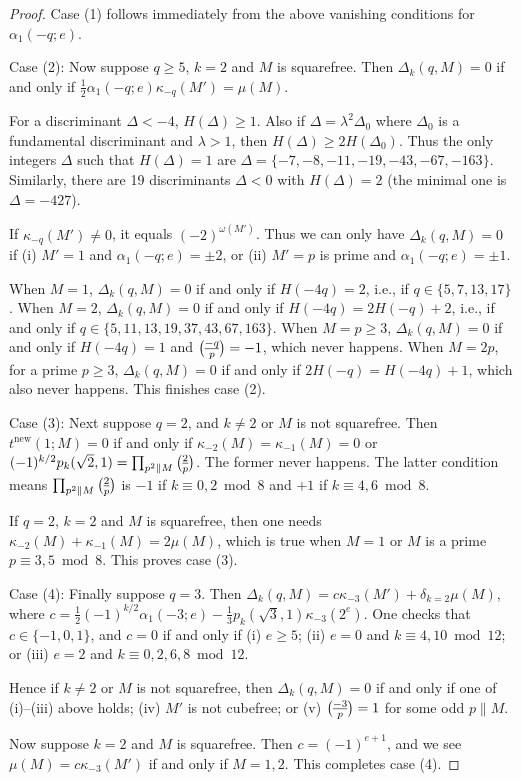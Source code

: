 \documentclass[10pt,a4paper]{amsart}
\newcommand{\leg}{\overwithdelims ()}
\newcommand{\new}{\mathrm{new}}
\renewcommand{\mod}{\bmod}
\begin{document}
\begin{proof} 

Case (1) follows immediately from the above vanishing conditions for $\alpha_1(-q;e)$.

Case (2): Now suppose $q \ge 5$, $k=2$ and $M$ is squarefree.  Then $\Delta_k(q,M) = 0$ if and only if $\frac 12 \alpha_1(-q;e) \kappa_{-q}(M') = \mu(M)$.  

For a discriminant $\Delta < -4$, $H(\Delta) \ge 1$.
Also if $\Delta = \lambda^2 \Delta_0$ where $\Delta_0$ is a fundamental discriminant and $\lambda > 1$, then $H(\Delta) \ge 2 H(\Delta_0)$.  Thus the only integers $\Delta$ such that $H(\Delta) = 1$ are $\Delta = \{ -7, -8, -11, -19, -43, -67, -163 \}$.  Similarly, there are 19 discriminants $\Delta < 0$ with $H(\Delta) = 2$ (the minimal one is $\Delta = -427$).

If $\kappa_{-q}(M') \ne 0$, it equals $(-2)^{\omega(M')}$.  Thus we can only have
$\Delta_k(q,M) = 0$ if (i) $M' = 1$ and $\alpha_1(-q; e) = \pm 2$, or (ii)  $M' = p$ is prime and $\alpha_1(-q; e) = \pm 1$.  

When $M=1$, $\Delta_k(q,M) = 0$ if and only if $H(-4q) = 2$, i.e., if $q \in \{ 5, 7, 13, 17 \}$.  When $M = 2$, $\Delta_k(q,M) = 0$ if and only if $H(-4q) = 2 H(-q) + 2$, i.e., if and only if $q \in \{ 5, 11, 13, 19, 37, 43, 67, 163 \}$.
When $M = p \ge 3$, $\Delta_k(q,M) = 0$ if and only if $H(-4q) = 1$ and ${-q \leg p} = -1$, which never happens.
When $M = 2p$, for a prime $p \ge 3$, $\Delta_k(q,M) = 0$ if and only if $2H(-q) = H(-4q) + 1$, which also never happens.  This finishes case (2).

Case (3): Next suppose $q=2$, and $k \ne 2$ or $M$ is not squarefree.  Then
$t^\new(1;M) = 0$ if and only if $\kappa_{-2}(M) = \kappa_{-1}(M) = 0$
or $(-1)^{k/2} p_k(\sqrt 2,1) = \prod_{p^2 \parallel M} {2 \leg p}$.  The former never happens.  The latter condition means $\prod_{p^2 \parallel M} {2 \leg p}$ is $-1$ if $k \equiv 0, 2 \mod 8$ and $+1$ if $k \equiv 4, 6 \mod 8$.

If $q=2$, $k=2$ and $M$ is squarefree, then one needs $\kappa_{-2}(M) + \kappa_{-1}(M) = 2\mu(M)$, which is true when $M = 1$ or $M$ is a prime $p \equiv 3, 5 \mod 8$.  This proves case (3).

Case (4): Finally suppose $q=3$.  Then $\Delta_k(q,M) = c \kappa_{-3}(M') + \delta_{k=2} \mu(M)$, where $c = \frac 12(-1)^{k/2} \alpha_1(-3;e) - \frac 13 p_k(\sqrt 3,1) \kappa_{-3}(2^e)$.  One checks that $c \in \{ -1, 0, 1 \}$, and
$c = 0$ if and only if (i) $e \ge 5$; (ii) $e =  0$ and $k \equiv 4, 10 \mod 12$; or (iii) $e = 2$ and $k \equiv 0, 2, 6, 8 \mod 12$.

Hence if $k \ne 2$ or $M$ is not squarefree, then $\Delta_k(q,M) = 0$ if and only if one of (i)--(iii) above holds; (iv) $M'$ is not cubefree; or (v) ${-3 \leg p} = 1$ for some odd $p \parallel M$.

Now suppose $k=2$ and $M$ is squarefree.  Then $c = (-1)^{e+1}$, and we see $\mu(M) = c \kappa_{-3}(M')$ if and only if $M = 1, 2$.  This completes case (4).
\end{proof}
\end{document}
